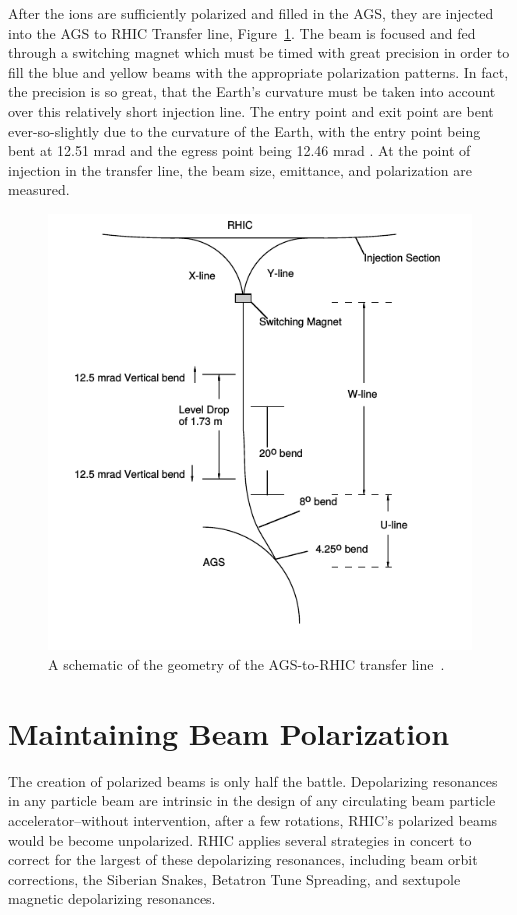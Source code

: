 After the ions are sufficiently polarized and filled in the AGS, they are
injected into the AGS to RHIC Transfer line, Figure~\ref{fig:ags_to_rhic}. The
beam is focused and fed through a switching magnet which must be timed with
great precision in order to fill the blue and yellow beams with the appropriate
polarization patterns. In fact, the precision is so great, that the Earth's
curvature must be taken into account over this relatively short injection line.
The entry point and exit point are bent ever-so-slightly due to the curvature of
the Earth, with the entry point being bent at 12.51 mrad and the egress point
being 12.46 mrad \cite{RHIC2006}.  At the point of injection in the transfer
line, the beam size, emittance, and polarization are measured. 

\begin{figure}
  \centering
  \includegraphics[width=0.6\linewidth]{./figures/ags_to_rhic_transfer}
  \caption{
    A schematic of the geometry of the AGS-to-RHIC transfer line~\cite{RHIC2006}.
  }
  \label{fig:ags_to_rhic}
\end{figure}

\clearpage
\section{Maintaining Beam Polarization}
\label{sec:beam_polarization}

The creation of polarized beams is only half the battle. Depolarizing resonances
in any particle beam are intrinsic in the design of any circulating beam
particle accelerator--without intervention, after a few rotations, RHIC's
polarized beams would be become unpolarized. RHIC applies several strategies in
concert to correct for the largest of these depolarizing resonances, including
beam orbit corrections, the Siberian Snakes, Betatron Tune Spreading, and
sextupole magnetic depolarizing resonances. 

